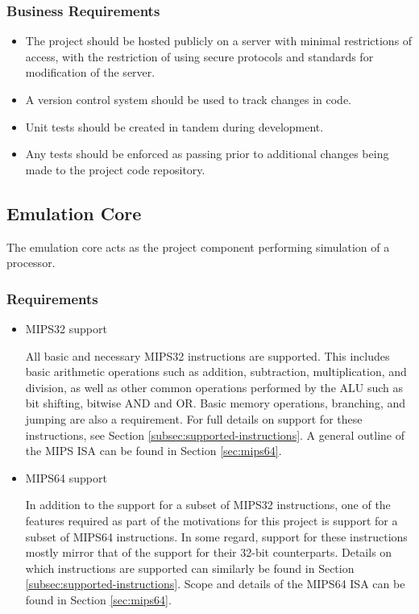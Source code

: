 \documentclass[
    paper=letter,
    parskip=half,
    fontsize=12pt,
    titlepage=firstiscover,
    toc=bibliography,
    numbers=endperiod
]{scrartcl}
\begin{document}
\subsubsection{Business Requirements}
\begin{itemize}
    \item The project should be hosted publicly on a server with minimal
          restrictions of access, with the restriction of using secure protocols
          and standards for modification of the server.
    \item A version control system should be used to track changes in code.
    \item Unit tests should be created in tandem during development.
    \item Any tests should be enforced as passing prior to additional changes
          being made to the project code repository.
\end{itemize}

\subsection{Emulation Core}
The emulation core acts as the project component performing simulation
of a processor.

\subsubsection{Requirements}
\begin{itemize}
    \item MIPS32 support

          All basic and necessary MIPS32 instructions are supported. This includes
          basic arithmetic operations such as addition, subtraction,
          multiplication, and division, as well as other common operations
          performed by the ALU such as bit shifting, bitwise AND and OR. Basic
          memory operations, branching, and jumping are also a requirement. For
          full details on support for these instructions, see Section
          \ref{subsec:supported-instructions}. A general outline of the MIPS ISA
          can be found in Section \ref{sec:mips64}.

    \item MIPS64 support

          In addition to the support for a subset of MIPS32 instructions, one of
          the features required as part of the motivations for this project is
          support for a subset of MIPS64 instructions. In some regard, support for
          these instructions mostly mirror that of the support for their 32-bit
          counterparts. Details on which instructions are supported can similarly
          be found in Section \ref{subsec:supported-instructions}. Scope and
          details of the MIPS64 ISA can be found in Section \ref{sec:mips64}.
\end{itemize}
\end{document}
